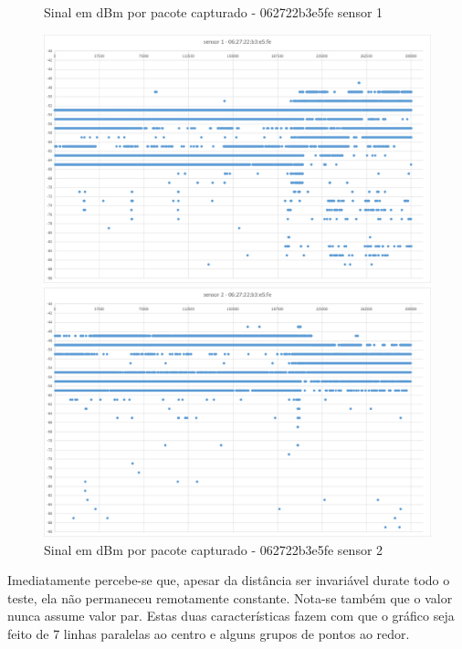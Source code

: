 \begin{figure}[htb]
\begin{minipage}{0.49\textwidth}
	\end{minipage}
\hfill
	\begin{minipage}{0.49\textwidth}
	\centering
		\caption{\label{fig-062722b3e5fe-s1}Sinal em dBm por pacote capturado - 062722b3e5fe sensor 1}
		\includegraphics[width=1\textwidth]{060-testes/data-analisis/night-run/062722b3e5fe-sensor-01.png}
	\end{minipage}
\hfill
	\begin{minipage}{0.49\textwidth}
	\centering
		\caption{\label{fig-062722b3e5fe-s2}Sinal em dBm por pacote capturado - 062722b3e5fe sensor 2}
		\includegraphics[width=1\textwidth]{060-testes/data-analisis/night-run/062722b3e5fe-sensor-02.png}
	\end{minipage}
\end{figure}

Imediatamente percebe-se que, apesar da distância ser invariável durate todo o
teste, ela não permaneceu remotamente constante. Nota-se também que o valor
nunca assume valor par. Estas duas características fazem com que o gráfico
seja feito de 7 linhas paralelas ao centro e alguns grupos de pontos ao redor.

